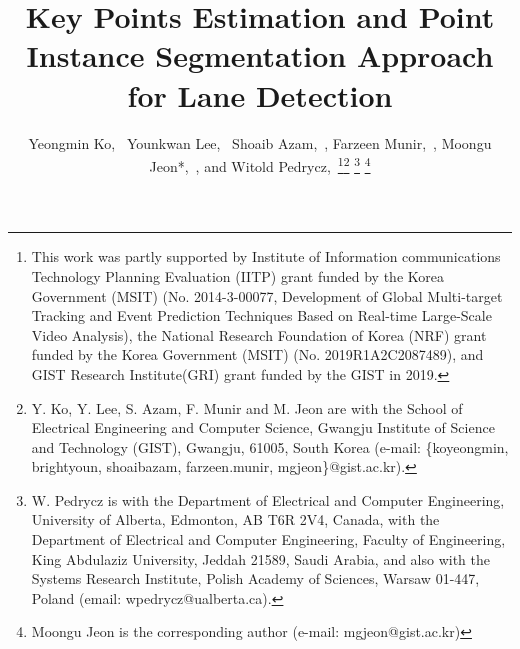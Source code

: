 \documentclass[journal]{IEEEtran}
\begin{document}
\title{Key Points Estimation and Point Instance Segmentation Approach for Lane Detection}


\author{Yeongmin Ko,~
       Younkwan Lee,~
       Shoaib Azam,~,
       Farzeen Munir,~,
       Moongu Jeon*,~, and
       Witold Pedrycz,~\thanks{This work was partly supported by Institute of Information communications Technology Planning Evaluation (IITP) grant funded by the Korea Government (MSIT) (No. 2014-3-00077, Development of Global Multi-target Tracking and Event Prediction Techniques Based on Real-time Large-Scale Video Analysis), the National Research Foundation of Korea (NRF) grant funded by the Korea Government (MSIT) (No. 2019R1A2C2087489), and GIST Research Institute(GRI) grant funded by the GIST in 2019.}\thanks{Y. Ko, Y. Lee, S. Azam, F. Munir and M. Jeon are with the School of Electrical Engineering and Computer Science, Gwangju Institute of Science and Technology (GIST),
Gwangju, 61005, South Korea (e-mail: \{koyeongmin, brightyoun, shoaibazam, farzeen.munir, mgjeon\}@gist.ac.kr).}
\thanks{W. Pedrycz is with the Department of Electrical and Computer Engineering, University of Alberta, Edmonton, AB T6R 2V4, Canada, with the Department of Electrical and Computer Engineering, Faculty of Engineering, King Abdulaziz University, Jeddah 21589, Saudi Arabia, and also with the Systems Research Institute, Polish Academy of Sciences, Warsaw 01-447, Poland (email: wpedrycz@ualberta.ca).}
\thanks{Moongu Jeon is the corresponding author (e-mail: mgjeon@gist.ac.kr)}
}





\end{document}
